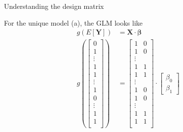 \documentclass[10pt]{beamer}
\begin{document}
\begin{frame}[fragile]{Understanding the design matrix}

For the unique model (a), the GLM  looks like 
\begin{align*}
g(E[\mathbf{Y}]) &= \mathbf{X} \cdot \mathbf{\beta}\\
    g( 
    \begin{bmatrix}
           0 \\
           1 \\
           \vdots \\
           1 \\
           1 \\
           \vdots \\
           1 \\
           0 \\
           \vdots \\
           1 \\
           1 \\
    \end{bmatrix} ) &= 
    \begin{bmatrix}
           1 & 0 \\
           1 & 0 \\
           \vdots \\
           1 & 1 \\
           1 & 1 \\
           \vdots \\
           1 & 0 \\
           1 & 0 \\
           \vdots \\
           1 & 1 \\
           1 & 1 \\
    \end{bmatrix} \cdot
    \begin{bmatrix}
           \beta_0 \\
           \beta_1 
    \end{bmatrix}
\end{align*}

\end{frame}
\end{document}
